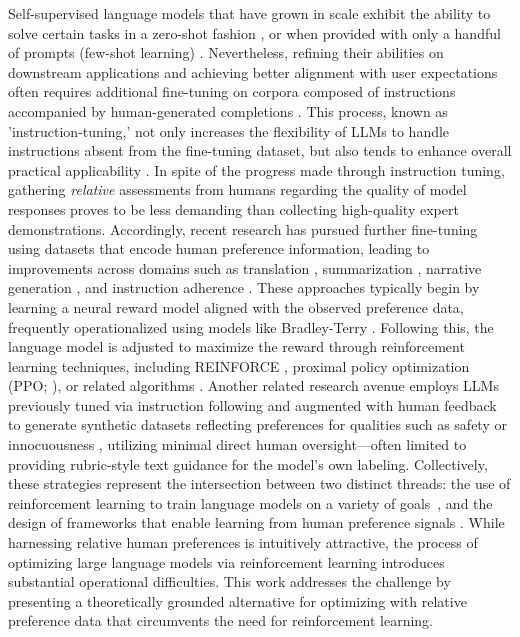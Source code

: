 Self-supervised language models that have grown in scale exhibit the ability to solve certain tasks in a zero-shot fashion \citep{radford2019language}, or when provided with only a handful of prompts (few-shot learning) \citep{gpt3,megatron,chowdhery2022palm}. Nevertheless, refining their abilities on downstream applications and achieving better alignment with user expectations often requires additional fine-tuning on corpora composed of instructions accompanied by human-generated completions \citep{mishra-etal-2022-cross,sanh2022multitask,chung2022scaling,thoppilan2022lamda}. This process, known as 'instruction-tuning,' not only increases the flexibility of LLMs to handle instructions absent from the fine-tuning dataset, but also tends to enhance overall practical applicability \citep{chung2022scaling}. In spite of the progress made through instruction tuning, gathering \textit{relative} assessments from humans regarding the quality of model responses proves to be less demanding than collecting high-quality expert demonstrations. Accordingly, recent research has pursued further fine-tuning using datasets that encode human preference information, leading to improvements across domains such as translation \citep{kreutzer-etal-2018-reliability}, summarization \citep{stiennon2022learning,ziegler2020finetuning}, narrative generation \citep{ziegler2020finetuning}, and instruction adherence \citep{ouyang2022training,ramamurthy2023is}. These approaches typically begin by learning a neural reward model aligned with the observed preference data, frequently operationalized using models like Bradley-Terry \citep{bradley1952rankanalysis}. Following this, the language model is adjusted to maximize the reward through reinforcement learning techniques, including REINFORCE \citep{williams1992reinforce}, proximal policy optimization (PPO; \cite{schulman2017proximal}), or related algorithms \citep{ramamurthy2023is}. Another related research avenue employs LLMs previously tuned via instruction following and augmented with human feedback to generate synthetic datasets reflecting preferences for qualities such as safety or innocuousness \citep{bai2022constitutional}, utilizing minimal direct human oversight—often limited to providing rubric-style text guidance for the model's own labeling. Collectively, these strategies represent the intersection between two distinct threads: the use of reinforcement learning to train language models on a variety of goals~\citep{Ranzato2015SequenceLT,paulus2018a,wu2018learning}, and the design of frameworks that enable learning from human preference signals \citep{christiano2017deep,kupcsik2018learning}. While harnessing relative human preferences is intuitively attractive, the process of optimizing large language models via reinforcement learning introduces substantial operational difficulties. This work addresses the challenge by presenting a theoretically grounded alternative for optimizing with relative preference data that circumvents the need for reinforcement learning.

